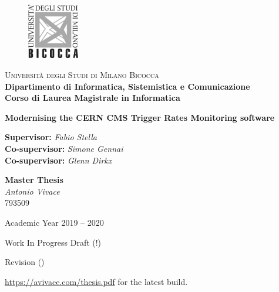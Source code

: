 
\thispagestyle{empty}

\begin{figure}
	\vspace*{-8mm}
	\centering
	\includegraphics[width=0.20\textwidth]{logo-bicocca.jpg}
\end{figure}
\large \noindent \textsc{Università degli Studi di Milano Bicocca} \\
\textbf{Dipartimento di Informatica, Sistemistica e Comunicazione \\
	Corso di Laurea Magistrale in Informatica}

\vfill


\begin{center}
	{\Huge \textbf{Modernising the CERN CMS Trigger Rates Monitoring software}}
\end{center}

\vfill

\begin{flushleft}
	{\Large \textbf{Supervisor:} \textit{Fabio Stella} \\
		\textbf{Co-supervisor:} \textit{Simone Gennai} \\
		\textbf{Co-supervisor:} \textit{Glenn Dirkx}}
\end{flushleft}

\vspace{8mm}
\par

\begin{flushright}
	{\Large \textbf{Master Thesis} \\
		\textit{Antonio Vivace} \\ 793509}
\end{flushright}

\vfill
\par

\begin{center}
	{\large Academic Year 2019 -- 2020}

	\hfill\linebreak
	Work In Progress Draft (!)

	Revision \texttt{\revision} (\texttt{\revisiondate})

	\url{https://avivace.com/thesis.pdf} for the latest build.
\end{center}

\clearpage
